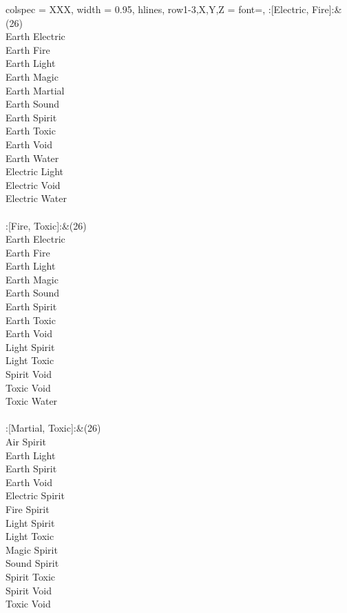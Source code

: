 \begin{longtblr}[
	caption = {2v2 Attacking Ineffective},
	label = {2v2-Attacking-Ineffective},
]{
	colspec = {XXX}, width = 0.95\linewidth,
	hlines,
	row{1-3,X,Y,Z} = {font=\bfseries},
}
	:[Electric, Fire]:&{(26)\\
	Earth Electric \\
	Earth Fire \\
	Earth Light \\
	Earth Magic \\
	Earth Martial \\
	Earth Sound \\
	Earth Spirit \\
	Earth Toxic \\
	Earth Void \\
	Earth Water \\
	Electric Light \\
	Electric Void \\
	Electric Water \\
	}\\

	:[Fire, Toxic]:&{(26)\\
	Earth Electric \\
	Earth Fire \\
	Earth Light \\
	Earth Magic \\
	Earth Sound \\
	Earth Spirit \\
	Earth Toxic \\
	Earth Void \\
	Light Spirit \\
	Light Toxic \\
	Spirit Void \\
	Toxic Void \\
	Toxic Water \\
	}\\

	:[Martial, Toxic]:&{(26)\\
	Air Spirit \\
	Earth Light \\
	Earth Spirit \\
	Earth Void \\
	Electric Spirit \\
	Fire Spirit \\
	Light Spirit \\
	Light Toxic \\
	Magic Spirit \\
	Sound Spirit \\
	Spirit Toxic \\
	Spirit Void \\
	Toxic Void \\
	}\\


\end{longtblr}
